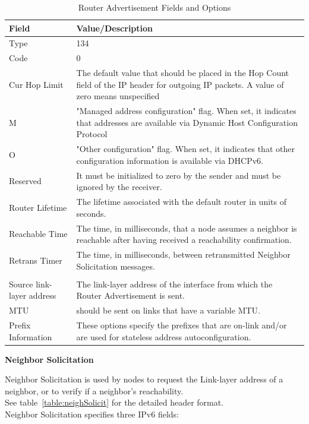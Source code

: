 \documentclass[12pt]{article}
\begin{document}
\begin{savenotes}
\begin{table}[h]
\centering
\begin{tabular}{|L{3.0cm}|L{11.6cm}|}
\hline
Field&Value/Description\\
\hline
Type&134\\
\hline
Code&0\\
\hline
Cur Hop Limit&The default value that should be placed in the Hop Count field of the IP header for outgoing IP packets. A value of zero means unspecified\\
\hline
M&"Managed address configuration" flag. When set, it indicates that addresses are available via Dynamic Host Configuration Protocol\\
\hline
O&"Other configuration" flag. When set, it indicates that other configuration information is available via DHCPv6.\\
\hline
Reserved&It must be initialized to zero by the sender and must be ignored by the receiver.\\
\hline
Router Lifetime&The lifetime associated with the default router in units of seconds.\\
\hline
Reachable Time&The time, in milliseconds, that a node assumes a neighbor is reachable after having received a reachability confirmation.\\
\hline
Retrans Timer&The time, in milliseconds, between retransmitted Neighbor Solicitation messages.\\
\hline
{}
\\
\hline
Source link-layer address &The link-layer address of the interface from which the Router Advertisement is sent.\\
\hline
MTU&should be sent on links that have a variable MTU.\\
\hline
Prefix Information&These options specify the prefixes that are on-link and/or are used for stateless address autoconfiguration.\\
\hline
\end{tabular}
\caption{Router Advertisement Fields and Options}
\label{table:routerAdvfields}
\end{table}
\end{savenotes}

\textbf{Neighbor Solicitation}

Neighbor Solicitation is used by nodes to request the Link-layer address of a neighbor, or to verify if a neighbor's reachability.\\
See table~\ref{table:neighSolicit} for the detailed header format.\\
Neighbor Solicitation specifies three IPv6 fields:
\end{document}
